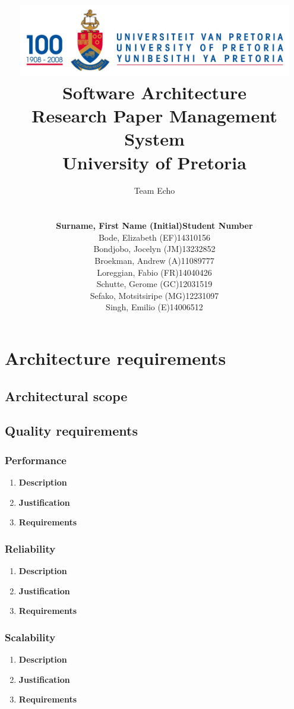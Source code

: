 \documentclass[a4paper,10pt]{article}
\title{\includegraphics[width=12cm]{Eeufeeslogo.jpg} \\
       Software Architecture \\
       Research Paper Management System \\
       \vspace{0.5cm}
       University of Pretoria \\
       \vspace{1.0cm}
       }
\date{}
\author{Team Echo\\
	\vspace{0.5cm} \\
	\begin{tabu} to \textwidth { X[l] X[l]}
		\hline
		\textbf{Surname, First Name (Initial)}	& \textbf{Student Number}	\\ \hline \hline
		Bode, Elizabeth (EF)			& 14310156		\\ \hline
		Bondjobo, Jocelyn (JM)		& 13232852		\\ \hline
		Broekman, Andrew (A)		& 11089777		\\ \hline
		Loreggian, Fabio (FR)			& 14040426		\\ \hline
		Schutte, Gerome (GC)		& 12031519		\\ \hline
		Sefako, Motsitsiripe (MG)		& 12231097		\\ \hline
		Singh, Emilio (E)			& 14006512		\\ \hline
		\hline
	\end{tabu}}
\begin{document}
\maketitle
\thispagestyle{empty}
\clearpage

\newpage
{}
\thispagestyle{empty}
\tableofcontents
\clearpage

\newpage
{}

\section{Architecture requirements}
\subsection{Architectural scope}
\subsection{Quality requirements}
	\subsubsection{Performance}
		\begin{enumerate}
			\item \textbf{Description} \\
			\item \textbf{Justification} \\
			\item \textbf{Requirements}\\
		\end{enumerate}

	\subsubsection{Reliability}
		\begin{enumerate}
			\item \textbf{Description} \\
			\item \textbf{Justification} \\
			\item \textbf{Requirements}\\
		\end{enumerate}

	\subsubsection{Scalability}
		\begin{enumerate}
			\item \textbf{Description} \\
			\item \textbf{Justification} \\
			\item \textbf{Requirements}\\
		\end{enumerate}
\end{document}
